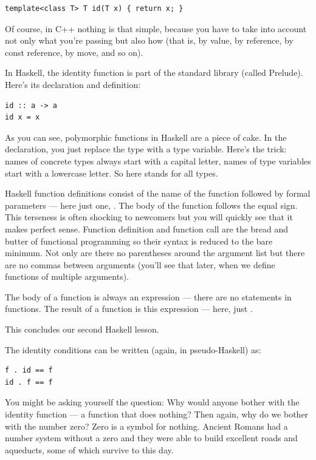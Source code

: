 \begin{Verbatim}[commandchars=\\\{\}]
template<class T> T id(T x) { return x; }
\end{Verbatim}
Of course, in C++ nothing is that simple, because you have to take into
account not only what you're passing but also how (that is, by value, by
reference, by const reference, by move, and so on).

In Haskell, the identity function is part of the standard library
(called Prelude). Here's its declaration and definition:

\begin{Verbatim}[commandchars=\\\{\}]
id :: a -> a
id x = x
\end{Verbatim}
As you can see, polymorphic functions in Haskell are a piece of cake. In
the declaration, you just replace the type with a type variable. Here's
the trick: names of concrete types always start with a capital letter,
names of type variables start with a lowercase letter. So here
 stands for all types.

Haskell function definitions consist of the name of the function
followed by formal parameters --- here just one, . The body of
the function follows the equal sign. This terseness is often shocking to
newcomers but you will quickly see that it makes perfect sense. Function
definition and function call are the bread and butter of functional
programming so their syntax is reduced to the bare minimum. Not only are
there no parentheses around the argument list but there are no commas
between arguments (you'll see that later, when we define functions of
multiple arguments).

The body of a function is always an expression --- there are no
statements in functions. The result of a function is this expression ---
here, just .

This concludes our second Haskell lesson.

The identity conditions can be written (again, in pseudo-Haskell) as:

\begin{Verbatim}[commandchars=\\\{\}]
f . id == f
id . f == f
\end{Verbatim}
You might be asking yourself the question: Why would anyone bother with
the identity function --- a function that does nothing? Then again, why
do we bother with the number zero? Zero is a symbol for nothing. Ancient
Romans had a number system without a zero and they were able to build
excellent roads and aqueducts, some of which survive to this day.

